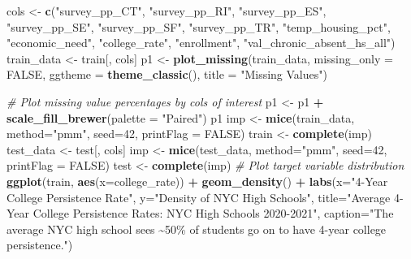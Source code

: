 \documentclass[
  man,floatsintext]{apa6}
\newenvironment{Shaded}{\begin{snugshade}}{\end{snugshade}}
\newcommand{\AttributeTok}[1]{\textcolor[rgb]{0.13,0.29,0.53}{#1}}
\newcommand{\CommentTok}[1]{\textcolor[rgb]{0.56,0.35,0.01}{\textit{#1}}}
\newcommand{\ConstantTok}[1]{\textcolor[rgb]{0.56,0.35,0.01}{#1}}
\newcommand{\DecValTok}[1]{\textcolor[rgb]{0.00,0.00,0.81}{#1}}
\newcommand{\FunctionTok}[1]{\textcolor[rgb]{0.13,0.29,0.53}{\textbf{#1}}}
\newcommand{\NormalTok}[1]{#1}
\newcommand{\OtherTok}[1]{\textcolor[rgb]{0.56,0.35,0.01}{#1}}
\newcommand{\SpecialCharTok}[1]{\textcolor[rgb]{0.81,0.36,0.00}{\textbf{#1}}}
\newcommand{\StringTok}[1]{\textcolor[rgb]{0.31,0.60,0.02}{#1}}
\begin{document}
\begin{Shaded}
\begin{Highlighting}[]
\NormalTok{cols }\OtherTok{\textless{}{-}} \FunctionTok{c}\NormalTok{(}\StringTok{"survey\_pp\_CT"}\NormalTok{, }\StringTok{"survey\_pp\_RI"}\NormalTok{,}
          \StringTok{"survey\_pp\_ES"}\NormalTok{, }\StringTok{"survey\_pp\_SE"}\NormalTok{,}
          \StringTok{"survey\_pp\_SF"}\NormalTok{, }\StringTok{"survey\_pp\_TR"}\NormalTok{,}
          \StringTok{"temp\_housing\_pct"}\NormalTok{, }\StringTok{"economic\_need"}\NormalTok{,}
          \StringTok{"college\_rate"}\NormalTok{, }\StringTok{"enrollment"}\NormalTok{,}
          \StringTok{"val\_chronic\_absent\_hs\_all"}\NormalTok{)}
\NormalTok{train\_data }\OtherTok{\textless{}{-}}\NormalTok{ train[, cols]}
\NormalTok{p1 }\OtherTok{\textless{}{-}} \FunctionTok{plot\_missing}\NormalTok{(train\_data, }\AttributeTok{missing\_only =} \ConstantTok{FALSE}\NormalTok{,}
                   \AttributeTok{ggtheme =} \FunctionTok{theme\_classic}\NormalTok{(), }\AttributeTok{title =} \StringTok{"Missing Values"}\NormalTok{)}

\CommentTok{\# Plot missing value percentages by cols of interest}
\NormalTok{p1 }\OtherTok{\textless{}{-}}\NormalTok{ p1 }\SpecialCharTok{+} 
    \FunctionTok{scale\_fill\_brewer}\NormalTok{(}\AttributeTok{palette =} \StringTok{"Paired"}\NormalTok{)}
\NormalTok{p1}
\NormalTok{imp }\OtherTok{\textless{}{-}} \FunctionTok{mice}\NormalTok{(train\_data, }\AttributeTok{method=}\StringTok{"pmm"}\NormalTok{, }\AttributeTok{seed=}\DecValTok{42}\NormalTok{, }\AttributeTok{printFlag =} \ConstantTok{FALSE}\NormalTok{)}
\NormalTok{train }\OtherTok{\textless{}{-}} \FunctionTok{complete}\NormalTok{(imp)}
\NormalTok{test\_data }\OtherTok{\textless{}{-}}\NormalTok{ test[, cols]}
\NormalTok{imp }\OtherTok{\textless{}{-}} \FunctionTok{mice}\NormalTok{(test\_data, }\AttributeTok{method=}\StringTok{"pmm"}\NormalTok{, }\AttributeTok{seed=}\DecValTok{42}\NormalTok{, }\AttributeTok{printFlag =} \ConstantTok{FALSE}\NormalTok{)}
\NormalTok{test }\OtherTok{\textless{}{-}} \FunctionTok{complete}\NormalTok{(imp)}
\CommentTok{\# Plot target variable distribution}
\FunctionTok{ggplot}\NormalTok{(train, }\FunctionTok{aes}\NormalTok{(}\AttributeTok{x=}\NormalTok{college\_rate)) }\SpecialCharTok{+} 
    \FunctionTok{geom\_density}\NormalTok{() }\SpecialCharTok{+} 
    \FunctionTok{labs}\NormalTok{(}\AttributeTok{x=}\StringTok{"4{-}Year College Persistence Rate"}\NormalTok{,}
         \AttributeTok{y=}\StringTok{"Density of NYC High Schools"}\NormalTok{,}
         \AttributeTok{title=}\StringTok{"Average 4{-}Year College Persistence Rates: NYC High Schools 2020{-}2021"}\NormalTok{,}
         \AttributeTok{caption=}\StringTok{"The average NYC high school sees \textasciitilde{}50\% of students go on to have 4{-}year college persistence."}\NormalTok{)}


\end{Highlighting}
\end{Shaded}
\end{document}
